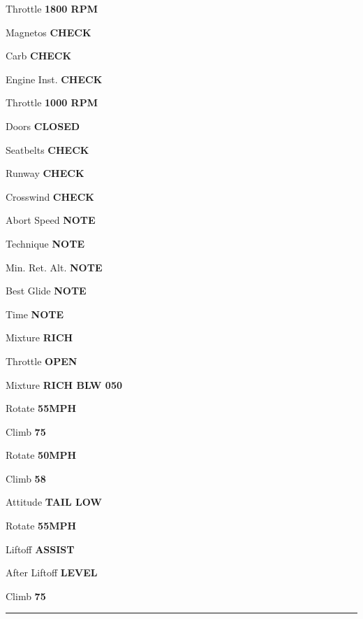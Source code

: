 \documentclass[8pt]{article}
\begin{document}
\begin{multicols*}{3}
Throttle \dotfill \textbf{1800 RPM}

Magnetos \dotfill \textbf{CHECK}

Carb \dotfill \textbf{CHECK}

Engine Inst. \dotfill \textbf{CHECK}

Throttle \dotfill \textbf{1000 RPM}

Doors \dotfill \textbf{CLOSED}

Seatbelts \dotfill \textbf{CHECK}

\pagebreak


\colorbox{green!80!red}{}

Runway \dotfill \textbf{CHECK}

Crosswind \dotfill \textbf{CHECK}

Abort Speed \dotfill \textbf{NOTE}

Technique \dotfill \textbf{NOTE}

Min. Ret. Alt. \dotfill \textbf{NOTE}

Best Glide \dotfill \textbf{NOTE}

Time \dotfill \textbf{NOTE}

Mixture \dotfill \textbf{RICH} \\

\colorbox{green!80!red}{}

Throttle \dotfill \textbf{OPEN}

Mixture \dotfill \textbf{RICH BLW 050} \\

\colorbox{cyan}{}

\colorbox{cyan!70}{}

Rotate \dotfill \textbf{55MPH}

Climb \dotfill \textbf{75}

\colorbox{cyan!70}{}

Rotate \dotfill \textbf{50MPH}

Climb \dotfill \textbf{58}

\colorbox{cyan!70}{}

Attitude \dotfill \textbf{TAIL LOW}

Rotate \dotfill \textbf{55MPH}

Liftoff \dotfill \textbf{ASSIST}

After Liftoff \dotfill \textbf{LEVEL}

Climb \dotfill \textbf{75}

\hrule

\end{multicols*}
\end{document}
